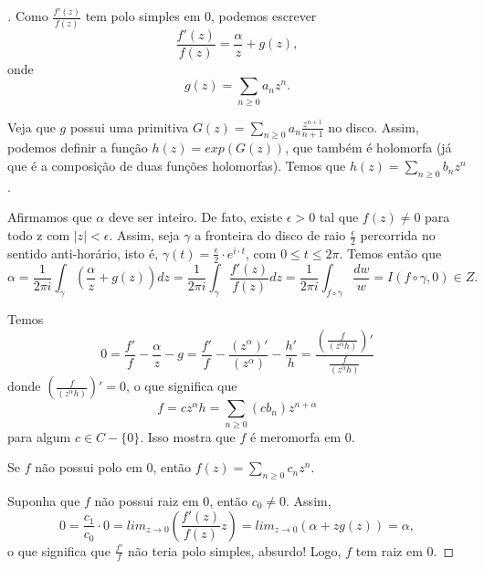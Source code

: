 \begin{proof}[]

Como $\frac{f'(z)}{f(z)}$ tem polo simples em $0$, podemos escrever $$\frac{f'(z)}{f(z)}=\frac{\alpha}{z}+g(z),$$ onde $$g(z)=\sum_{n\geq 0}a_nz^n.$$

Veja que $g$ possui uma primitiva $G(z)=\sum_{n\geq 0}a_n\frac{z^{n+1}}{n+1}$ no disco. Assim, podemos definir a função $h(z)=exp(G(z))$, que também é holomorfa (já que é a composição de duas funções holomorfas). Temos que $h(z)=\sum_{n\geq 0}b_nz^n$.

Afirmamos que $\alpha$ deve ser inteiro. De fato, existe $\epsilon>0$ tal que $f(z)\neq 0$ para todo z com $\lvert z\rvert <\epsilon$. Assim, seja $\gamma$ a fronteira do disco de raio $\frac{\epsilon}{2}$ percorrida no sentido anti-horário, isto é, $\gamma(t)=\frac{\epsilon}{2}\cdot e^{i\cdot t}$, com $0\leq t\leq 2\pi$. Temos então que $$\alpha=\frac{1}{2\pi i}\int_{\gamma}\left(\frac{\alpha}{z}+g(z)\right) dz=\frac{1}{2\pi i}\int_{\gamma}\frac{f'(z)}{f(z)}dz=\frac{1}{2\pi i}\int_{f\circ\gamma}\frac{dw}{w}=I(f \circ \gamma, 0)\in Z.$$

Temos $$0=\frac{f'}{f}-\frac{\alpha}{z}-g=\frac{f'}{f}-\frac{(z^{\alpha})'}{(z^{\alpha})}-\frac{h'}{h}=\frac{(\frac{f}{(z^{\alpha}h)})'}{\frac{f}{(z^{\alpha}h)}}$$ donde $(\frac{f}{(z^{\alpha}h)})'=0$, o que significa que $$f=cz^{\alpha}h=\sum_{n \geq 0}(cb_n)z^{n+\alpha}$$ para algum $c\in C-\{0\}$. Isso mostra que $f$ é meromorfa em $0$.

Se $f$ não possui polo em $0$, então $f(z)=\sum_{n\geq 0}c_nz^n$.

Suponha que $f$ não possui raiz em $0$, então $c_0\neq 0$. Assim, $$0=\frac{c_1}{c_0}\cdot 0=lim_{z\rightarrow 0}\left(\frac{f'(z)}{f(z)}z\right)=lim_{z\rightarrow 0}\left(\alpha+zg(z)\right)=\alpha,$$ o que significa que $\frac{f'}{f}$ não teria polo simples, absurdo! Logo, $f$ tem raiz em $0$.

\end{proof}

